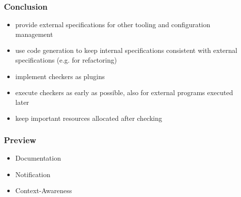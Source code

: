 \begin{frame}
	\frametitle{Conclusion}

	\begin{itemize}[<+-| alert@+>]
	\item provide external specifications for other tooling and configuration management
	\item use code generation to keep internal specifications consistent with external specifications (e.g. for refactoring)
	\item implement checkers as plugins
	\item execute checkers as early as possible,
	also for external programs executed later
	\item keep important resources allocated after checking
	\end{itemize}

\end{frame}


\begin{frame}
	\frametitle{Preview}

	\begin{itemize}
	\item Documentation
	\item Notification
	\item Context-Awareness
	\end{itemize}
\end{frame}




\nocite{raab2017introducing}

\appendix

\begin{frame}[allowframebreaks]
	
	
\end{frame}




